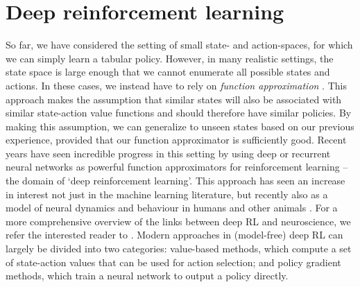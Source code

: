 \section{Deep reinforcement learning}
\label{sec:deep_RL}

So far, we have considered the setting of small state- and action-spaces, for which we can simply learn a tabular policy.
However, in many realistic settings, the state space is large enough that we cannot enumerate all possible states and actions.
In these cases, we instead have to rely on \emph{function approximation} \citep{sutton2018reinforcement}.
This approach makes the assumption that similar states will also be associated with similar state-action value functions and should therefore have similar policies.
By making this assumption, we can generalize to unseen states based on our previous experience, provided that our function approximator is sufficiently good.
Recent years have seen incredible progress in this setting by using deep or recurrent neural networks as powerful function approximators for reinforcement learning -- the domain of `deep reinforcement learning'.
This approach has seen an increase in interest not just in the machine learning literature, but recently also as a model of neural dynamics and behaviour in humans and other animals \citep{wang2018prefrontal, jensen2023recurrent, makino2023arithmetic, merel2019deep, banino2018vector}.
For a more comprehensive overview of the links between deep RL and neuroscience, we refer the interested reader to \citet{botvinick2020deep}.
Modern approaches in (model-free) deep RL can largely be divided into two categories: value-based methods, which compute a set of state-action values that can be used for action selection; and policy gradient methods, which train a neural network to output a policy directly.





